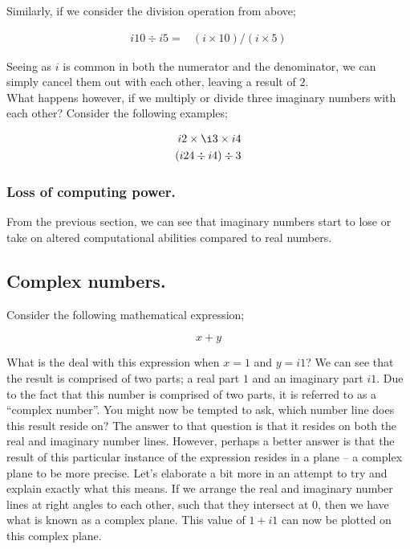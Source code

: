 \documentclass{article}
\begin{document}
Similarly, if we consider the division operation from above;

\begin{align*}
i10 \div i5 =& (i \times 10) / (i \times 5)
\end{align*}

Seeing as $i$ is common in both the numerator and the denominator, we can simply cancel them out with each other,
leaving a result of $2$.\\

What happens however, if we multiply or divide three imaginary numbers with each other? Consider the following
examples;

\begin{align*}
i2 \times \i3 \times i4 \\
(i24 \div i4) \div 3 
\end{align*}


\subsubsection{Loss of computing power.}



From the previous section, we can see that imaginary numbers start to lose or take on altered computational
abilities compared to real numbers.


\subsection{Complex numbers.}

Consider the following mathematical expression;

\begin{equation*}
x + y
\end{equation*}

What is the deal with this expression when $x=1$ and $y=i1$? We can see that the result is comprised of two
parts; a real part $1$ and an imaginary part $i1$. Due to the fact that this number is comprised of two parts, it is
referred to as a ``complex number''. You might now be tempted to ask, which number line does this result reside on? The
answer to that question is that it resides on both the real and imaginary number lines. However, perhaps a better
answer is that
the result of this particular instance of the expression resides in a plane -- a complex plane to be more precise.
Let's elaborate a bit more in an attempt to try and explain exactly what this means. If we arrange the real and imaginary number
lines at right angles to each other, such that they intersect at 0, then we have what is known as a complex plane.
This value of $1 + i1$ can now be plotted on this complex plane.
\end{document}
